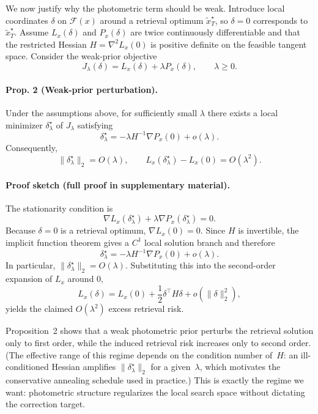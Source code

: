 \documentclass[sigconf,screen,review,anonymous]{acmart}
\begin{document}
We now justify why the photometric term should be weak.
Introduce local coordinates $\delta$ on $\mathcal{F}(x)$ around a retrieval
optimum $\tilde{x}_T^{\star}$, so $\delta=0$ corresponds to
$\tilde{x}_T^{\star}$.
Assume $L_x(\delta)$ and $P_x(\delta)$ are twice continuously differentiable
and that the restricted Hessian
$H = \nabla^2 L_x(0)$ is positive definite on the feasible tangent space.
Consider the weak-prior objective
\[
  J_{\lambda}(\delta) = L_x(\delta) + \lambda P_x(\delta),
  \qquad
  \lambda \ge 0.
\]

\paragraph{Prop. 2 (Weak-prior perturbation).}
Under the assumptions above, for sufficiently small $\lambda$ there exists a
local minimizer $\delta_{\lambda}^{\star}$ of $J_{\lambda}$ satisfying
\[
  \delta_{\lambda}^{\star}
  =
  -\lambda H^{-1}\nabla P_x(0) + o(\lambda).
\]
Consequently,
\[
  \|\delta_{\lambda}^{\star}\|_2 = O(\lambda),
  \qquad
  L_x(\delta_{\lambda}^{\star}) - L_x(0) = O(\lambda^2).
\]

\paragraph{Proof sketch (full proof in supplementary material).}
The stationarity condition is
\[
  \nabla L_x(\delta_{\lambda}^{\star})
  +
  \lambda \nabla P_x(\delta_{\lambda}^{\star}) = 0.
\]
Because $\delta=0$ is a retrieval optimum, $\nabla L_x(0)=0$.
Since $H$ is invertible, the implicit function theorem gives a $C^1$ local
solution branch and therefore
\[
  \delta_{\lambda}^{\star}
  =
  -\lambda H^{-1}\nabla P_x(0) + o(\lambda).
\]
In particular, $\|\delta_{\lambda}^{\star}\|_2 = O(\lambda)$.
Substituting this into the second-order expansion of $L_x$ around $0$,
\[
  L_x(\delta)
  =
  L_x(0) + \frac{1}{2}\delta^{\top}H\delta + o(\|\delta\|_2^2),
\]
yields the claimed $O(\lambda^2)$ excess retrieval risk.

Proposition~2 shows that a weak photometric prior perturbs the retrieval
solution only to first order, while the induced retrieval risk increases only
to second order.
(The effective range of this regime depends on the condition number of~$H$:
an ill-conditioned Hessian amplifies $\|\delta_{\lambda}^{\star}\|_2$ for a
given~$\lambda$, which motivates the conservative annealing schedule used in
practice.)
This is exactly the regime we want: photometric structure regularizes the local
search space without dictating the correction target.
\end{document}
